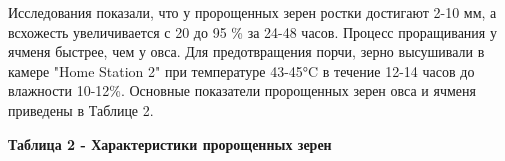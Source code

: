 
Исследования показали, что у пророщенных зерен ростки достигают 2-10 мм,
а всхожесть увеличивается с 20 до 95 \% за 24-48 часов. Процесс
проращивания у ячменя быстрее, чем у овса. Для предотвращения порчи,
зерно высушивали в камере "Home Station 2" при температуре 43-45°C в
течение 12-14 часов до влажности 10-12\%. Основные показатели
пророщенных зерен овса и ячменя приведены в Таблице 2.

{\bfseries Таблица 2 - Характеристики пророщенных зерен}

